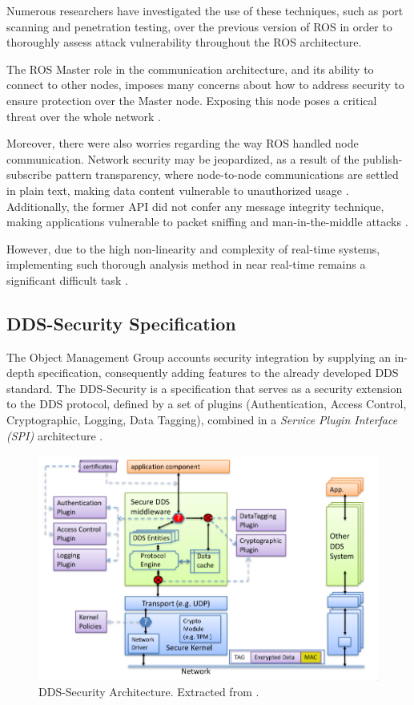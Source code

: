 Numerous researchers \cite{8794451, dieber2020penetration} have investigated the use of these techniques, such as port scanning and penetration testing, over the previous version of ROS in order to thoroughly assess attack vulnerability throughout the ROS architecture. 

The ROS Master role in the communication architecture, and its ability to connect to other nodes, imposes many concerns about how to address security to ensure protection over the Master node. Exposing this node poses a critical threat over the whole network \cite{8794451}. 

Moreover, there were also worries regarding the way ROS handled node communication. Network security may be jeopardized, as a result of the publish-subscribe pattern transparency, where node-to-node communications are settled in plain text, making data content vulnerable to unauthorized usage \cite{kim2018security, white2016sros}. Additionally, the former API did not confer any message integrity technique, making applications vulnerable to packet sniffing and man-in-the-middle attacks \cite{white2016sros}.
 
However, due to the high non-linearity and complexity of real-time systems, implementing such thorough analysis method in near real-time remains a significant difficult task \cite{diao2009design}.

\subsection{DDS-Security Specification}

The Object Management Group accounts security integration by supplying an in-depth specification, consequently adding features to the already developed DDS standard. The DDS-Security is a specification that serves as a security extension to the DDS protocol, defined by a set of plugins (Authentication, Access Control, Cryptographic, Logging, Data Tagging), combined in a \textit{Service Plugin Interface (SPI)} architecture \cite{8442103, ros-dds-integration}.

\begin{figure}[H]
    \centering
    \includegraphics[width=0.7\linewidth]{img/dds-security-architecture.png}
    \caption{DDS-Security Architecture. Extracted from \cite{dds-s}.}
    \label{fig:dds-security-architecture}
\end{figure}

